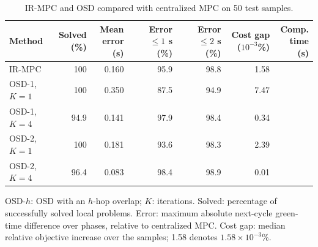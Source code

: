 \begin{table}[h!]
\centering
\caption{IR-MPC and OSD compared with centralized MPC on 50 test samples.}
\label{tab:distributed}
\begingroup
\footnotesize
\setlength{\tabcolsep}{1.5pt}
\renewcommand{\arraystretch}{1.05}
\begin{tabular}{@{}lrrrrrr@{}}
\toprule
Method & \shortstack{Solved\\(\%)} & \shortstack{Mean\\error (s)} & \shortstack{Error\\$\le1$ s (\%)} & \shortstack{Error\\$\le2$ s (\%)} & \shortstack{Cost gap\\($10^{-3}$\%)} & \shortstack{Comp.\\time (s)} \\
\midrule
IR-MPC & 100 & 0.160 & 95.9 & 98.8 & 1.58 & \phantom{0.00} \\
OSD-1, $K=1$ & 100 & 0.350 & 87.5 & 94.9 & 7.47 & \phantom{0.00} \\
OSD-1, $K=4$ & 94.9 & 0.141 & 97.9 & 98.4 & 0.34 & \phantom{0.00} \\
OSD-2, $K=1$ & 100 & 0.181 & 93.6 & 98.3 & 2.39 & \phantom{0.00} \\
OSD-2, $K=4$ & 96.4 & 0.083 & 98.4 & 98.9 & 0.01 & \phantom{0.00} \\
\bottomrule
\end{tabular}
\par\smallskip
\begin{minipage}{\columnwidth}
\footnotesize
OSD-$h$: OSD with an $h$-hop overlap; $K$: iterations. Solved: percentage of successfully solved local problems. Error: maximum absolute next-cycle green-time difference over phases, relative to centralized MPC. Cost gap: median relative objective increase over the samples; 1.58 denotes $1.58\times10^{-3}$\%.
\end{minipage}
\endgroup
\end{table}
